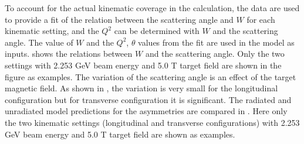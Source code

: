 To account for the actual kinematic coverage in the calculation, the data are used to provide a fit of the relation between the scattering angle and $W$ for each kinematic setting, and the $Q^2$ can be determined with $W$ and the scattering angle. The value of $W$ and the $Q^2$, $\theta$ values from the fit are used in the model as inputs.  shows the relations between $W$ and the scattering angle. Only the two settings with 2.253 GeV beam energy and 5.0 T target field are shown in the figure as examples. The variation of the scattering angle is an effect of the target magnetic field. As shown in , the variation is very small for the longitudinal configuration but for transverse configuration it is significant. The radiated and unradiated model predictions for the asymmetries are compared in . Here only the two kinematic settings (longitudinal and transverse configurations) with 2.253 GeV beam energy and 5.0 T target field are shown as examples.

